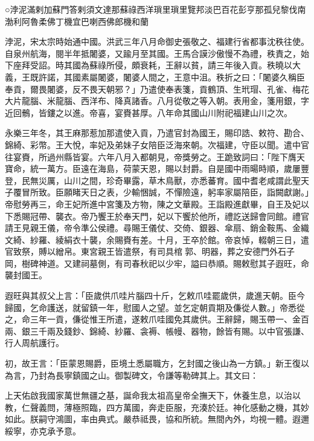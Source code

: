 
\begin{pinyinscope}
○浡泥滿剌加蘇門答剌須文達那蘇祿西洋瑣里瑣里覽邦淡巴百花彭亨那孤兒黎伐南渤利阿魯柔佛丁機宜巴喇西佛郎機和蘭

浡泥，宋太宗時始通中國。洪武三年八月命御史張敬之、福建行省都事沈秩往使。自泉州航海，閱半年抵闍婆，又踰月至其國。王馬合謨沙傲慢不為禮，秩責之，始下座拜受詔。時其國為蘇祿所侵，頗衰耗，王辭以貧，請三年後入貢。秩曉以大義，王既許諾，其國素屬闍婆，闍婆人間之，王意中沮。秩折之曰：「闍婆久稱臣奉貢，爾畏闍婆，反不畏天朝邪？」乃遣使奉表箋，貢鶴頂、生玳瑁、孔雀、梅花大片龍腦、米龍腦、西洋布、降真諸香。八月從敬之等入朝。表用金，箋用銀，字近回鶻，皆鏤之以進。帝喜，宴賚甚厚。八年命其國山川附祀福建山川之次。

永樂三年冬，其王麻那惹加那遣使入貢，乃遣官封為國王，賜印誥、敕符、勘合、錦綺、彩幣。王大悅，率妃及弟妹子女陪臣泛海來朝。次福建，守臣以聞。遣中官往宴賚，所過州縣皆宴。六年八月入都朝見，帝獎勞之。王跪致詞曰：「陛下膺天寶命，統一萬方。臣遠在海島，荷蒙天恩，賜以封爵。自是國中雨暘時順，歲屢豐登，民無災厲，山川之間，珍奇畢露，草木鳥獸，亦悉蕃育。國中耆老咸謂此聖天子覆冒所致。臣願睹天日之表，少輸悃誠，不憚險遠，躬率家屬陪臣，詣闕獻謝。」帝慰勞再三，命王妃所進中宮箋及方物，陳之文華殿。王詣殿進獻畢，自王及妃以下悉賜冠帶、襲衣。帝乃饗王於奉天門，妃以下饗於他所，禮訖送歸會同館。禮官請王見親王儀，帝令準公侯禮。尋賜王儀仗、交倚、銀器、傘扇、銷金鞍馬、金織文綺、紗羅、綾絹衣十襲，余賜賚有差。十月，王卒於館。帝哀悼，輟朝三日，遣官致祭，賻以繒帛。東宮親王皆遣祭，有司具棺郭、明器，葬之安德門外石子岡，樹碑神道。又建祠墓側，有司春秋祀以少牢，謚曰恭順。賜敕慰其子遐旺，命襲封國王。

遐旺與其叔父上言：「臣歲供爪哇片腦四十斤，乞敕爪哇罷歲供，歲進天朝。臣今歸國，乞命護送，就留鎮一年，慰國人之望。並乞定朝貢期及傔從人數。」帝悉從之，命三年一貢，傔從惟王所遣，遂敕爪哇國免其歲供。王辭歸，賜玉帶一、金百兩、銀三千兩及錢鈔、錦綺、紗羅、衾褥、帳幔、器物，餘皆有賜。以中官張謙、行人周航護行。

初，故王言：「臣蒙恩賜爵，臣境土悉屬職方，乞封國之後山為一方鎮。」新王復以為言，乃封為長寧鎮國之山。御製碑文，令謙等勒碑其上。其文曰：

上天佑啟我國家萬世無疆之基，誕命我太祖高皇帝全撫天下，休養生息，以治以教，仁聲義問，薄極照臨，四方萬國，奔走臣服，充湊於廷。神化感動之機，其妙如此。朕嗣守鴻圖，率由典式。嚴恭祗畏，協和所統。無間內外，均視一體。遐邇綏寧，亦克承予意。


\end{pinyinscope}
